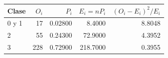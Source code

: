 \begin{tabular}{lrrrr}
\toprule
\textbf{Clase} & \textbf{$O_i$} & \textbf{$P_i$} & \textbf{$E_i=nP_i$} & \textbf{$(O_i-E_i)^2/E_i$} \\ \midrule
0 y 1 & 17 & 0.02800 & 8.4000 & 8.8048 \\
2 & 55 & 0.24300 & 72.9000 & 4.3952 \\
3 & 228 & 0.72900 & 218.7000 & 0.3955 \\
\bottomrule
\end{tabular}